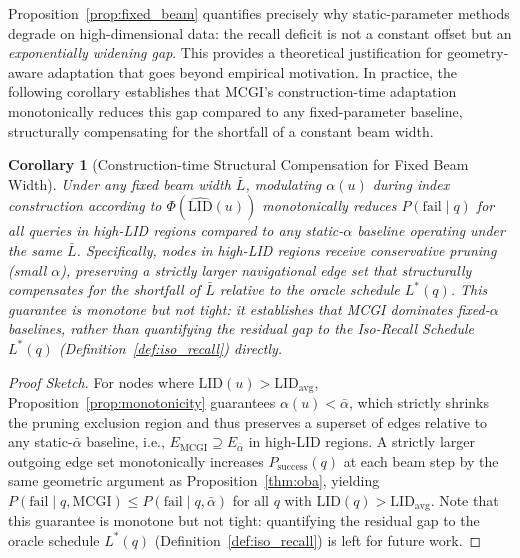 \documentclass{article}
\theoremstyle{plain}
\newtheorem{corollary}[theorem]{Corollary}
\theoremstyle{definition}
\theoremstyle{remark}
\newcommand{\ours}{MCGI\xspace}
\begin{document}
Proposition~\ref{prop:fixed_beam} quantifies precisely why
static-parameter methods degrade on high-dimensional data: the
recall deficit is not a constant offset but an
\emph{exponentially widening gap}. This provides a theoretical
justification for geometry-aware adaptation that goes beyond
empirical motivation. In practice, the following corollary establishes that MCGI's construction-time adaptation monotonically reduces this gap compared to any fixed-parameter baseline, structurally compensating for the shortfall of a constant beam width.

\begin{corollary}[Construction-time Structural Compensation for Fixed Beam Width]
\label{cor:construction_approx}
Under any fixed beam width $\bar{L}$, modulating $\alpha(u)$ during index construction according to $\Phi(\widehat{\mathrm{LID}}(u))$ monotonically reduces $P(\mathrm{fail} \mid q)$ for all queries in high-LID regions compared to any static-$\alpha$ baseline operating under the same $\bar{L}$. Specifically, nodes in high-LID regions receive conservative pruning (small $\alpha$), preserving a strictly larger navigational edge set that structurally compensates for the shortfall of $\bar{L}$ relative to the oracle schedule $L^*(q)$. This guarantee is monotone but not tight: it establishes that \ours{}
dominates fixed-$\alpha$ baselines, rather than quantifying the residual gap to the Iso-Recall Schedule $L^*(q)$ (Definition~\ref{def:iso_recall}) directly.
\end{corollary}

\begin{proof}[Proof Sketch]
For nodes where $\mathrm{LID}(u) > \mathrm{LID}_{\mathrm{avg}}$,
Proposition~\ref{prop:monotonicity} guarantees $\alpha(u) < \bar{\alpha}$,
which strictly shrinks the pruning exclusion region and thus preserves
a superset of edges relative to any static-$\bar{\alpha}$ baseline,
i.e., $E_{\mathrm{MCGI}} \supseteq E_{\bar{\alpha}}$ in high-LID regions.
A strictly larger outgoing edge set monotonically increases
$P_{\mathrm{success}}(q)$ at each beam step by the same geometric
argument as Proposition~\ref{thm:oba}, yielding
$P(\mathrm{fail} \mid q, \mathrm{MCGI}) \leq P(\mathrm{fail} \mid q,
\bar{\alpha})$ for all $q$ with $\mathrm{LID}(q) > \mathrm{LID}_{\mathrm{avg}}$.
Note that this guarantee is monotone but not tight: quantifying the
residual gap to the oracle schedule $L^*(q)$ (Definition~\ref{def:iso_recall})
is left for future work.
\end{proof}
\end{document}
